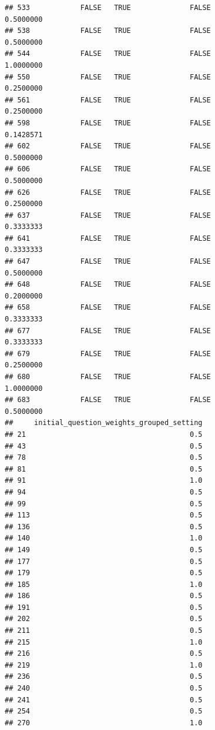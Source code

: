 \documentclass[
]{article}
\begin{document}
\begin{verbatim}
## 533            FALSE   TRUE              FALSE                0.5000000
## 538            FALSE   TRUE              FALSE                0.5000000
## 544            FALSE   TRUE              FALSE                1.0000000
## 550            FALSE   TRUE              FALSE                0.2500000
## 561            FALSE   TRUE              FALSE                0.2500000
## 598            FALSE   TRUE              FALSE                0.1428571
## 602            FALSE   TRUE              FALSE                0.5000000
## 606            FALSE   TRUE              FALSE                0.5000000
## 626            FALSE   TRUE              FALSE                0.2500000
## 637            FALSE   TRUE              FALSE                0.3333333
## 641            FALSE   TRUE              FALSE                0.3333333
## 647            FALSE   TRUE              FALSE                0.5000000
## 648            FALSE   TRUE              FALSE                0.2000000
## 658            FALSE   TRUE              FALSE                0.3333333
## 677            FALSE   TRUE              FALSE                0.3333333
## 679            FALSE   TRUE              FALSE                0.2500000
## 680            FALSE   TRUE              FALSE                1.0000000
## 683            FALSE   TRUE              FALSE                0.5000000
##     initial_question_weights_grouped_setting
## 21                                       0.5
## 43                                       0.5
## 78                                       0.5
## 81                                       0.5
## 91                                       1.0
## 94                                       0.5
## 99                                       0.5
## 113                                      0.5
## 136                                      0.5
## 140                                      1.0
## 149                                      0.5
## 177                                      0.5
## 179                                      0.5
## 185                                      1.0
## 186                                      0.5
## 191                                      0.5
## 202                                      0.5
## 211                                      0.5
## 215                                      1.0
## 216                                      0.5
## 219                                      1.0
## 236                                      0.5
## 240                                      0.5
## 241                                      0.5
## 254                                      0.5
## 270                                      1.0

\end{verbatim}
\end{document}
